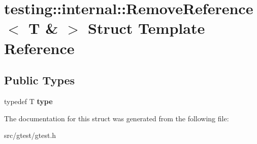 \hypertarget{structtesting_1_1internal_1_1_remove_reference_3_01_t_01_6_01_4}{}\section{testing\+:\+:internal\+:\+:Remove\+Reference$<$ T \& $>$ Struct Template Reference}
\label{structtesting_1_1internal_1_1_remove_reference_3_01_t_01_6_01_4}
\subsection*{Public Types}
\begin{DoxyCompactItemize}
\item 
\mbox{\label{structtesting_1_1internal_1_1_remove_reference_3_01_t_01_6_01_4_a3d0f32a66759f333c2dd66aa31005e6d}} 
typedef T {\bfseries type}
\end{DoxyCompactItemize}


The documentation for this struct was generated from the following file\+:\begin{DoxyCompactItemize}
\item 
src/gtest/gtest.\+h\end{DoxyCompactItemize}
